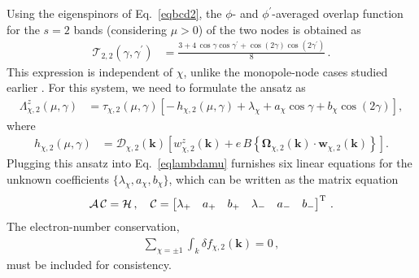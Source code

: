 \documentclass[aps,prb,onecolumn,nofootinbib,citeautoscript,10pt]{revtex4-2}
\begin{document}
Using the eigenspinors of Eq.~\eqref{eqbcd2}, the $\phi$- and $\phi^\prime$-averaged overlap function for the $s=2$ bands (considering $\mu > 0$) of the two nodes is obtained as
\begin{align}
\label{eqoverlap-bcd-2node}
\mathcal T_{2,2}(\gamma,\gamma^\prime)
& = \frac{3 + 4\, \cos\gamma \cos\gamma^\prime
+ \cos(2\gamma) \cos(2\gamma^\prime)}{8} \,.
\end{align}
This expression is independent of $\chi $, unlike the monopole-node cases studied earlier \cite{timm, ips-exact-spin1, ips-exact-kwn, ips-exact-rsw}. For this system, we need to formulate the ansatz as
\begin{align}
\label{eqansatz-2node}
\Lambda^z_{\chi,2}(\mu,\gamma) & = \tau_{\chi,2}(\mu,\gamma)
\left[ -\, h_{\chi,2}(\mu,\gamma) + \lambda_\chi + a_\chi \cos\gamma + b_\chi \cos(2\gamma) \right],
\end{align}
where
\begin{align}
h_{\chi,2}(\mu,\gamma)
& = \mathcal D_{\chi,2}(\boldsymbol k)
\left[ w^z_{\chi,2}(\boldsymbol k)+ e \,B \left\{ \boldsymbol\Omega_{\chi,2}(\boldsymbol k)
\cdot \boldsymbol w_{\chi,2}(\boldsymbol k) \right\} \right].
\end{align}
Plugging this ansatz into Eq.~\eqref{eqlambdamu} furnishes six linear equations for the unknown coefficients $\{\lambda_\chi, a_\chi, b_\chi\}$, which can be written as the matrix equation
\begin{align}
\label{eqmatrix-2node}
\mathcal A \, \mathcal C = \mathcal H \,, \quad
\mathcal C =
\begin{bmatrix}
\lambda_+ & a_+ & b_+ & \lambda_- & a_- & b_-
\end{bmatrix}^{\rm T} \,.
\end{align}
The electron-number conservation,
\begin{align}
\sum_{\chi=\pm1} \int_k \delta f_{\chi,2}(\boldsymbol k)=0 \,,
\end{align}
must be included for consistency.
\end{document}
